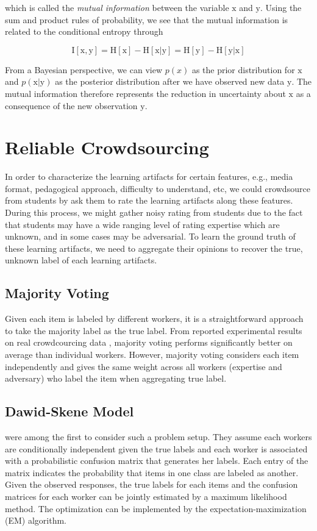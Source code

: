 \documentclass{article}
\begin{document}
which is called the \textit{mutual information} between the variable
$\mathrm{x}$ and $\mathrm{y}$. Using the sum and product rules of
probability, we see that the mutual information is related to the
conditional entropy through

\begin{equation}
  \mathrm{I}[\mathrm{x}, \mathrm{y}] = \mathrm{H}[\mathrm{x}] -
  \mathrm{H}[\mathrm{x|y}] = \mathrm{H}[\mathrm{y}] -
  \mathrm{H}[\mathrm{y|x}]
\end{equation}

From a Bayesian perspective, we can view $p(x)$ as the prior
distribution for $\mathrm{x}$ and $p(\mathrm{x}|\mathrm{y})$ as the posterior
distribution after we have observed new data $\mathrm{y}$. The mutual
information therefore represents the reduction in uncertainty about
$\mathrm{x}$ as a consequence of the new observation $\mathrm{y}$.

\section{Reliable Crowdsourcing}
In order to characterize the learning artifacts for certain features,
e.g., media format, pedagogical approach, difficulty to understand,
etc, we could crowdsource from students by ask them to rate the
learning artifacts along these features. During this process, we might
gather noisy rating from students due to the fact that students may
have a wide ranging level of rating expertise which are unknown, and
in some cases may be adversarial. To learn the ground truth of these
learning artifacts, we need to aggregate their opinions to recover the
true, unknown label of each learning artifacts.

\subsection{Majority Voting}
Given each item is labeled by different workers, it is a
straightforward approach to take the majority label as the true
label. From reported experimental results on real crowdcourcing data
\cite{Snow2008-rm}, majority voting performs significantly better on
average than individual workers. However, majority voting considers
each item independently and gives the same weight across all workers
(expertise and adversary)
who label the item when aggregating true label.

\subsection{Dawid-Skene Model}
\cite{dawid1979maximum} were among the first to consider such a
problem setup. They assume each workers are conditionally independent
given the true labels and each worker is associated with a
probabilistic confusion matrix that generates her labels. Each entry
of the matrix indicates the probability that items in one class are
labeled as another. Given the
observed responses, the true labels for each items and the confusion
matrices for each worker can be jointly estimated by a maximum
likelihood method. The optimization can be implemented by the
expectation-maximization (EM) algorithm.
\end{document}
